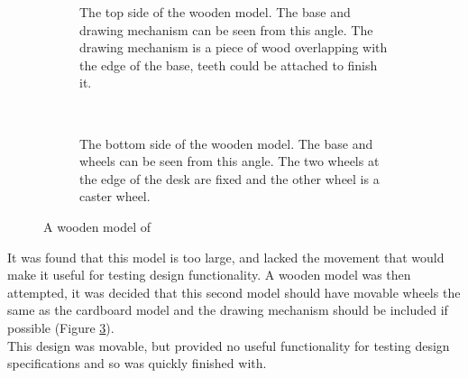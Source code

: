     \begin{figure}[tb]%
        \centering
        \begin{subfigure}[b]{0.45\textwidth}
            \caption{The top side of the wooden model. The base and drawing mechanism can be seen from this angle. The drawing mechanism is a piece of wood overlapping with the edge of the base, teeth could be attached to finish it.}
            \label{fig:wooden model 1}
        \end{subfigure}
        ~
        \begin{subfigure}[b]{0.45\textwidth}
            \caption{The bottom side of the wooden model. The base and wheels can be seen from this angle. The two wheels at the edge of the desk are fixed and the other wheel is a caster wheel.}
            \label{fig:wooden model 2}
        \end{subfigure}
        \caption{A wooden model of \SandE}
        \label{fig:wooden model}
    \end{figure}
	It was found that this model is too large, and lacked the movement that would make it useful for testing design functionality. A wooden model was then attempted, it was decided that this second model should have movable wheels the same as the cardboard model and the drawing mechanism should be included if possible (Figure \ref{fig:wooden model}).\\
    This design was movable, but provided no useful functionality for testing design specifications and so was quickly finished with.

